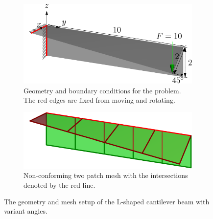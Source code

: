 \documentclass[preprint,12pt]{elsarticle}
\theoremstyle{remark}
\begin{document}
\begin{figure}[!hbt]
    \centering
    \captionsetup[subfigure]{font = footnotesize}
    \begin{subfigure}[b]{.48\textwidth}
        \centering
        \includegraphics[width = \textwidth]{L-beam-2-config}
        \caption{Geometry and boundary conditions for the problem. The red edges are fixed from moving and rotating.}\label{fig:L-beam-config-2}
    \end{subfigure}
    \begin{subfigure}[b]{.48\textwidth}
        \centering
        \includegraphics[width = \textwidth]{L-beam-decompose2}
        \caption{Non-conforming two patch mesh with the intersections denoted by the red line.}\label{fig:L-beam-decompose-2}
    \end{subfigure}
	\caption{The geometry and mesh setup of the L-shaped cantilever beam with variant angles.}\label{fig:L-beam-2}
\end{figure}
\end{document}
